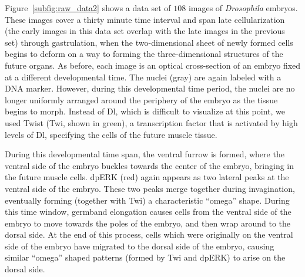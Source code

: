 \documentclass{pnastwo}
\begin{document}
\begin{article}
Figure~\ref{subfig:raw_data2} shows a data set of $108$ images of {\it Drosophila} embryos.
%
These images cover a thirty minute time interval and span late cellularization (the early images in this data set overlap with the late images in the previous set) through gastrulation, when the two-dimensional sheet of newly formed cells begins to deform on a way to forming the three-dimensional structures of the future organs. 
%
As before, each image is an optical cross-section of an embryo fixed at a different developmental time.
%
The nuclei (gray) are again labeled with a DNA marker.
%
However, during this developmental time period, the nuclei are no longer uniformly arranged around the periphery of the embryo as the tissue begins to morph.
%
Instead of Dl, which is difficult to visualize at this point, we used Twist (Twi, shown in green), a transcription factor that is activated by high levels of Dl, specifying the cells of the future muscle tissue.
%

%
During this developmental time span, the ventral furrow is formed, where the ventral side of the embryo buckles towards the center of the embryo, bringing in the future muscle cells.
%
dpERK (red) again appears as two lateral peaks at the ventral side of the embryo.
%
These two peaks merge together during invagination, eventually forming (together with Twi) a characteristic ``omega'' shape.
%
During this time window, germband elongation causes cells from the ventral side of the embryo to move towards the poles of the embryo, and then wrap around to the dorsal side.
%
At the end of this process, cells which were originally on the ventral side of the embryo have migrated to the dorsal side of the embryo, causing similar ``omega'' shaped patterns (formed by Twi and dpERK) to arise on the dorsal side.


\end{article}
\end{document}
